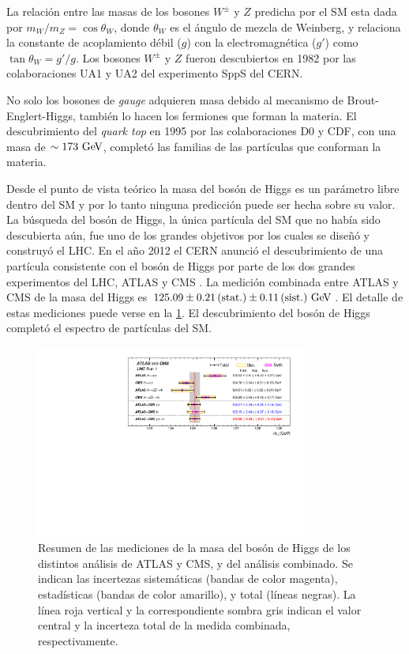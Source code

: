 La relación entre las masas de los bosones $W^\pm$ y $Z$ predicha por el SM esta
dada por $m_W/m_Z = \cos \theta_W$, donde $\theta_W$ es el ángulo de
mezcla de Weinberg, y relaciona la constante de acoplamiento débil ($g$) con la
electromagnética ($g'$) como $\tan\theta_W = g'/g$. Los bosones $W^\pm$ y $Z$
fueron descubiertos en 1982 por las colaboraciones UA1 y UA2 del experimento
SppS del CERN.

No solo los bosones de \emph{gauge} adquieren masa debido al mecanismo de Brout-Englert-Higgs,
también lo hacen los fermiones que forman la materia. El descubrimiento del
\emph{quark top} en 1995 por las colaboraciones D0 y CDF, con una masa de $\sim 173
\GeV$, completó las familias de las partículas que conforman la materia.

Desde el punto de vista teórico la masa del bosón de Higgs es un parámetro libre
dentro del SM y por lo tanto ninguna predicción puede ser hecha sobre su valor. La búsqueda
del bosón de Higgs, la única partícula del SM que no había sido descubierta
aún, fue uno de los grandes objetivos por los cuales se dise\~nó y construyó el
LHC. En el a\~no 2012 el CERN anunció el
descubrimiento de una partícula consistente con el bosón de Higgs por parte de
los dos grandes experimentos del LHC, ATLAS y CMS
\cite{Aad:2012tfa,Chatrchyan:2012ufa}. La medición combinada entre ATLAS y CMS
de la masa del Higgs es $125.09 \pm 0.21\, \text{(stat.)} \pm 0.11\, \text{(sist.)}
\gev$\cite{HiggsMass_ATLAS_CMS}. %
El detalle de estas mediciones  puede verse en la \cref{fig:higgs_cms_atlas}.
El descubrimiento del bosón de Higgs completó el espectro de partículas del SM.

\begin{figure}[!htbp]
  \centering
  \includegraphics[width=0.8\textwidth]{figures/higgs_atlas_cms_mass}
  \caption{Resumen de las mediciones de la masa del bosón de Higgs de los
    distintos análisis de ATLAS y CMS, y del análisis combinado. Se indican las
    incertezas sistemáticas (bandas de color magenta), estadísticas (bandas de
    color amarillo), y total (líneas negras). La línea roja vertical y la
    correspondiente sombra gris indican el valor central y la incerteza total de
    la medida combinada, respectivamente\cite{HiggsMass_ATLAS_CMS}.}
  \label{fig:higgs_cms_atlas}
\end{figure}




